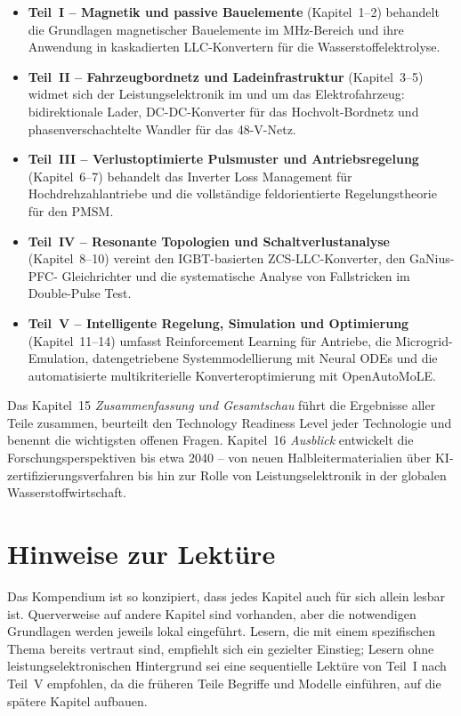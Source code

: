 ﻿\documentclass[a4paper,12pt,openany,oneside]{book}
\newcommand{\abschnitt}[1]{\section{#1}}
\theoremstyle{definition}
\begin{document}
\begin{itemize}
  \item \textbf{Teil~I -- Magnetik und passive Bauelemente} (Kapitel~1--2) behandelt
    die Grundlagen magnetischer Bauelemente im MHz-Bereich und ihre Anwendung in
    kaskadierten LLC-Konvertern f\"ur die Wasserstoffelektrolyse.
  \item \textbf{Teil~II -- Fahrzeugbordnetz und Ladeinfrastruktur} (Kapitel~3--5)
    widmet sich der Leistungselektronik im und um das Elektrofahrzeug: bidirektionale
    Lader, DC-DC-Konverter f\"ur das Hochvolt-Bordnetz und phasenverschachtelte
    Wandler f\"ur das 48-V-Netz.
  \item \textbf{Teil~III -- Verlustoptimierte Pulsmuster und Antriebsregelung}
    (Kapitel~6--7) behandelt das Inverter Loss Management f\"ur Hochdrehzahlantriebe
    und die vollst\"andige feldorientierte Regelungstheorie f\"ur den PMSM.
  \item \textbf{Teil~IV -- Resonante Topologien und Schaltverlustanalyse}
    (Kapitel~8--10) vereint den IGBT-basierten ZCS-LLC-Konverter, den GaNius-PFC-
    Gleichrichter und die systematische Analyse von Fallstricken im Double-Pulse Test.
  \item \textbf{Teil~V -- Intelligente Regelung, Simulation und Optimierung}
    (Kapitel~11--14) umfasst Reinforcement Learning f\"ur Antriebe, die Microgrid-
    Emulation, datengetriebene Systemmodellierung mit Neural ODEs und die
    automatisierte multikriterielle Konverteroptimierung mit OpenAutoMoLE.
\end{itemize}

Das Kapitel~15 \emph{Zusammenfassung und Gesamtschau} f\"uhrt die Ergebnisse aller
Teile zusammen, beurteilt den Technology Readiness Level jeder Technologie und benennt
die wichtigsten offenen Fragen. Kapitel~16 \emph{Ausblick} entwickelt die
Forschungsperspektiven bis etwa 2040 -- von neuen Halbleitermaterialien \"uber
KI-zertifizierungsverfahren bis hin zur Rolle von Leistungselektronik in der globalen
Wasserstoffwirtschaft.

\abschnitt{Hinweise zur Lekt\"ure}

Das Kompendium ist so konzipiert, dass jedes Kapitel auch f\"ur sich allein lesbar ist.
Querverweise auf andere Kapitel sind vorhanden, aber die notwendigen Grundlagen werden
jeweils lokal eingef\"uhrt. Lesern, die mit einem spezifischen Thema bereits vertraut
sind, empfiehlt sich ein gezielter Einstieg; Lesern ohne leistungselektronischen
Hintergrund sei eine sequentielle Lekt\"ure von Teil~I nach Teil~V empfohlen, da die
fr\"uheren Teile Begriffe und Modelle einf\"uhren, auf die sp\"atere Kapitel aufbauen.
\end{document}
